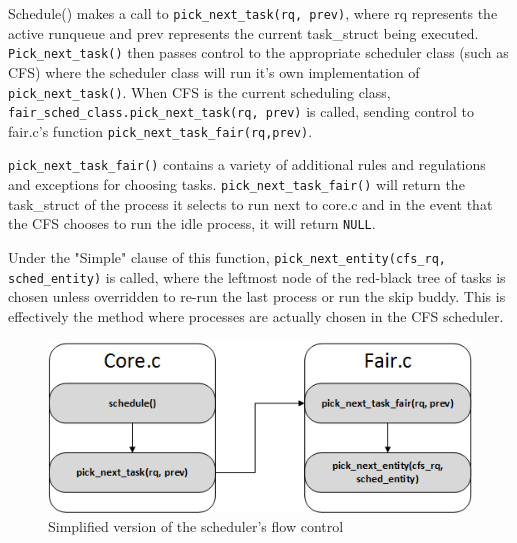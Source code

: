 Schedule() makes a call to \texttt{pick\_next\_task(rq, prev)}, where rq represents the active runqueue and prev represents the current task\_struct being executed. \texttt{Pick\_next\_task()} then passes control to the appropriate scheduler class (such as CFS) where the scheduler class will run it's own implementation of \texttt{pick\_next\_task()}. When CFS is the current scheduling class, \texttt{fair\_sched\_class.pick\_next\_task(rq, prev)} is called, sending control to fair.c's function \texttt{pick\_next\_task\_fair(rq,prev)}.

\texttt{pick\_next\_task\_fair()} contains a variety of additional rules and regulations and exceptions for choosing tasks. \texttt{pick\_next\_task\_fair()} will return the task\_struct of the process it selects to run next to core.c and in the event that the CFS chooses to run the idle process, it will return \texttt{NULL}.

Under the "Simple" clause of this function, \texttt{pick\_next\_entity(cfs\_rq, sched\_entity)} is called, where the leftmost node of the red-black tree of tasks is chosen unless overridden to re-run the last process or run the skip buddy. This is effectively the method where processes are actually chosen in the CFS scheduler.


\begin{figure}[hb]
	\includegraphics[width=1.0\columnwidth]{flowcontrol}
	\caption{Simplified version of the scheduler's flow control}
\end{figure}
